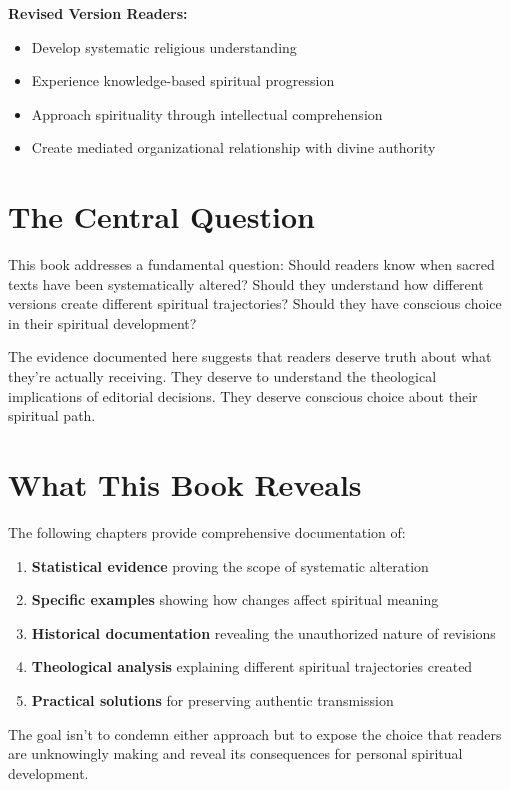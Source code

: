 \documentclass[11pt,twoside]{book}
\begin{document}
\textbf{\textbf{Revised Version Readers:}}
\begin{itemize}
\item Develop systematic religious understanding
\item Experience knowledge-based spiritual progression
\item Approach spirituality through intellectual comprehension
\item Create mediated organizational relationship with divine authority
\end{itemize}
\section*{The Central Question}
\label{sec:org1bf0c7f}

This book addresses a fundamental question: Should readers know when sacred texts have been systematically altered? Should they understand how different versions create different spiritual trajectories? Should they have conscious choice in their spiritual development?

The evidence documented here suggests that readers deserve truth about what they're actually receiving. They deserve to understand the theological implications of editorial decisions. They deserve conscious choice about their spiritual path.
\section*{What This Book Reveals}
\label{sec:orga1df25e}

The following chapters provide comprehensive documentation of:

\begin{enumerate}
\item \textbf{\textbf{Statistical evidence}} proving the scope of systematic alteration
\item \textbf{\textbf{Specific examples}} showing how changes affect spiritual meaning
\item \textbf{\textbf{Historical documentation}} revealing the unauthorized nature of revisions
\item \textbf{\textbf{Theological analysis}} explaining different spiritual trajectories created
\item \textbf{\textbf{Practical solutions}} for preserving authentic transmission
\end{enumerate}

The goal isn't to condemn either approach but to expose the choice that readers are unknowingly making and reveal its consequences for personal spiritual development.
\end{document}
